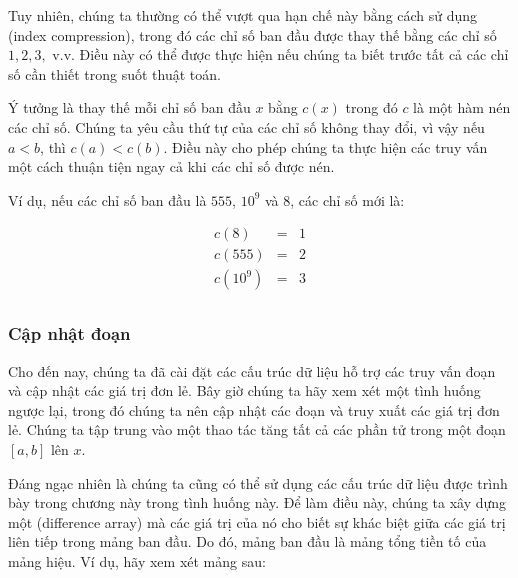 
Tuy nhiên, chúng ta thường có thể vượt qua hạn chế này
bằng cách sử dụng  (index compression),
trong đó các chỉ số ban đầu được thay thế
bằng các chỉ số $1,2,3,$ v.v.
Điều này có thể được thực hiện nếu chúng ta biết trước tất cả các chỉ số
cần thiết trong suốt thuật toán.

Ý tưởng là thay thế mỗi chỉ số ban đầu $x$
bằng $c(x)$ trong đó $c$ là một hàm
nén các chỉ số.
Chúng ta yêu cầu thứ tự của các chỉ số
không thay đổi, vì vậy nếu $a<b$, thì $c(a)<c(b)$.
Điều này cho phép chúng ta thực hiện các truy vấn một cách thuận tiện
ngay cả khi các chỉ số được nén.

Ví dụ, nếu các chỉ số ban đầu là
$555$, $10^9$ và $8$, các chỉ số mới là:

\[
\begin{array}{lcl}
c(8) & = & 1 \\
c(555) & = & 2 \\
c(10^9) & = & 3 \\
\end{array}
\]

\subsubsection{Cập nhật đoạn}

Cho đến nay, chúng ta đã cài đặt các cấu trúc dữ liệu
hỗ trợ các truy vấn đoạn và cập nhật
các giá trị đơn lẻ.
Bây giờ chúng ta hãy xem xét một tình huống ngược lại,
trong đó chúng ta nên cập nhật các đoạn và
truy xuất các giá trị đơn lẻ.
Chúng ta tập trung vào một thao tác tăng tất cả
các phần tử trong một đoạn $[a,b]$ lên $x$.


Đáng ngạc nhiên là chúng ta cũng có thể sử dụng các cấu trúc dữ liệu
được trình bày trong chương này trong tình huống này.
Để làm điều này, chúng ta xây dựng một  (difference array)
mà các giá trị của nó cho biết
sự khác biệt giữa các giá trị liên tiếp
trong mảng ban đầu.
Do đó, mảng ban đầu là
mảng tổng tiền tố của
mảng hiệu.
Ví dụ, hãy xem xét mảng sau:

\begin{center}
\end{center}

